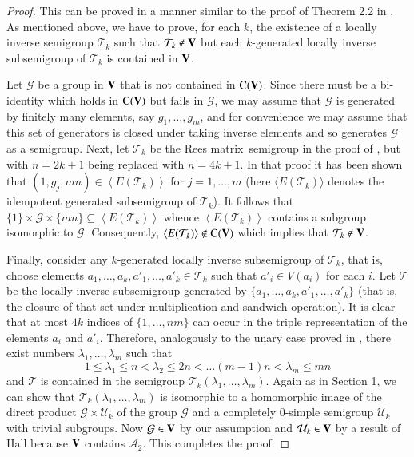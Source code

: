 \documentclass[preprint,1p,times]{elsarticle}
\numberwithin{equation}{section}
\theoremstyle{remark}
\def\pv#1{{\bf #1}}
\def\la{\lambda}
\def\Co{{\mathrm C}}
\def\Rm{Rees matrix}
\begin{document}
\begin{proof} This can be proved in a manner similar to the proof of
Theorem 2.2 in \cite{adv}.  As mentioned above, we have to prove, for each $k$, the existence of a locally inverse
semigroup $\mathcal{T}_k$ such that $\mathcal{T}_k\notin \pv V$ but each $k$-generated locally inverse subsemigroup of
$\mathcal{T}_k$ is contained in $\pv V$.

Let $\mathcal G$ be a group in $\pv V$ that is not contained in $\Co(\pv V)$. Since there must be a bi-identity which
holds in $\Co(\pv V)$ but fails in $\mathcal G$, we may assume that $\mathcal G$ is generated by finitely many
elements, say $g_1,\dots, g_m$, and for convenience we may assume that this set of generators is closed under taking
inverse elements and so generates $\mathcal{G}$ as a semigroup. Next, let $\mathcal{T}_k$ be the \Rm\ semigroup in the
proof of \cite[Theorem 2.2]{adv}, but with $n=2k+1$ being replaced with $n=4k+1$. In that proof it has been shown that
$(1,g_j,mn)\in \left<E(\mathcal{T}_k)\right>$ for $j=1,\dots, m$ (here $\langle E(\mathcal{T}_k)\rangle$ denotes the
idempotent generated subsemigroup of $\mathcal{T}_k$). It follows that $\{1\}\times \mathcal{G}\times\{mn\}\subseteq
\left<E(\mathcal{T}_k)\right>$ whence $\left<E(\mathcal{T}_k)\right>$ contains a subgroup isomorphic to $\mathcal{G}$.
Consequently, $\left<E(\mathcal{T}_k)\right>\notin \Co(\pv V)$ which implies that $\mathcal{T}_k\notin \pv V$.

Finally, consider any $k$-generated locally inverse subsemigroup of $\mathcal{T}_k$, that is, choose elements
$a_1,\dots,a_k,a'_1,\dots,a'_k\in \mathcal{T}_k$ such that $a'_i\in V(a_i)$ for each $i$. Let $\mathcal{T}$ be the
locally inverse subsemigroup generated by $\{a_1,\dots,a_k,a'_1,\dots,a'_k\}$ (that is, the closure of that set under
multiplication and sandwich operation). It is clear that at most $4k$ indices of $\{1,\dots,nm\}$ can occur in the
triple representation of the elements {$a_i$ and $a'_i$}. Therefore, analogously to the unary case proved in
\cite[Theorem 2.2]{adv}, there exist numbers $\la_1,\dots,\la_m$ such that
$$1\le\la_1\le n<\la_2\le 2n < \dots (m-1)n<\la_m\le mn$$
and $\mathcal{T}$ is contained in the semigroup $\mathcal{T}_k(\la_1,\dots,\la_m)$. Again as in Section 1, we can show
that $\mathcal{T}_k(\la_1,\dots,\la_m)$ is isomorphic to a homomorphic image of the direct product $\mathcal{G}\times
\mathcal{U}_k$ of the group $\mathcal G$ and a completely 0-simple semigroup $\mathcal{U}_k$ with trivial subgroups.
Now $\mathcal{G}\in \pv V$ by our assumption and $\mathcal{U}_k\in \pv V$ by a result of Hall \cite{H2} because $\pv V$
contains $\mathcal{A}_2$. This completes the proof.
\end{proof}
\end{document}
